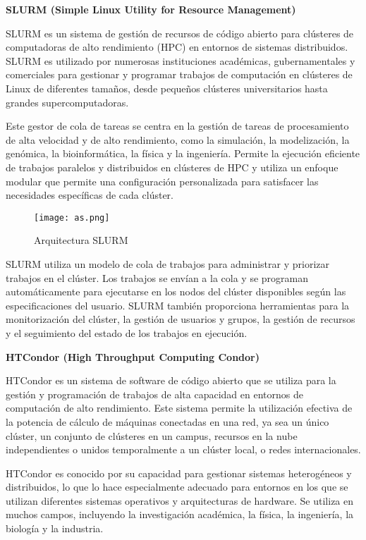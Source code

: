 \begin{spacing}{1.5}
  \textbf{SLURM (Simple Linux Utility for Resource Management)}

  SLURM es un sistema de gestión de recursos de código abierto para clústeres
  de computadoras de alto rendimiento (HPC) en entornos de sistemas distribuidos.
  SLURM es utilizado por numerosas instituciones académicas, gubernamentales y
  comerciales para gestionar y programar trabajos de computación en clústeres de
  Linux de diferentes tamaños, desde pequeños clústeres universitarios hasta
  grandes supercomputadoras. \cite{DEF-SLURM}

  Este gestor de cola de tareas se centra en la gestión de tareas de
  procesamiento de alta velocidad y de alto rendimiento, como la simulación, la
  modelización, la genómica, la bioinformática, la física y la ingeniería.
  Permite la ejecución eficiente de trabajos paralelos y distribuidos en
  clústeres de HPC y utiliza un enfoque modular que permite una configuración
  personalizada para satisfacer las necesidades específicas de cada clúster.

  \begin{figure}[h]
    \centering
    \texttt{[image: as.png]}
    \caption{Arquitectura SLURM}
    \label{fig:etiqueta}
  \end{figure}

  SLURM utiliza un modelo de cola de trabajos para administrar y priorizar
  trabajos en el clúster. Los trabajos se envían a la cola y se programan
  automáticamente para ejecutarse en los nodos del clúster disponibles según las
  especificaciones del usuario. SLURM también proporciona herramientas para la
  monitorización del clúster, la gestión de usuarios y grupos, la gestión de
  recursos y el seguimiento del estado de los trabajos en
  ejecución.\cite{DOC-SLURM}
  \vspace{3mm}

  \textbf{HTCondor (High Throughput Computing Condor)}

  HTCondor es un sistema de software de código abierto que se utiliza para la
  gestión y programación de trabajos de alta capacidad en entornos de computación
  de alto rendimiento. Este sistema permite la utilización efectiva de la
  potencia de cálculo de máquinas conectadas en una red, ya sea un único clúster,
  un conjunto de clústeres en un campus, recursos en la nube independientes o
  unidos temporalmente a un clúster local, o redes internacionales.
  \cite{DOC-HTCONDOR}

  HTCondor es conocido por su capacidad para gestionar sistemas heterogéneos y
  distribuidos, lo que lo hace especialmente adecuado para entornos en los que se
  utilizan diferentes sistemas operativos y arquitecturas de hardware. Se utiliza
  en muchos campos, incluyendo la investigación académica, la física, la
  ingeniería, la biología y la industria.


\end{spacing}
